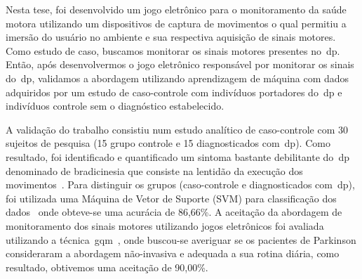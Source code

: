 


Nesta tese, foi desenvolvido um jogo eletrônico para o monitoramento da saúde motora utilizando um dispositivos de captura de movimentos o qual permitiu a imersão do usuário no ambiente e sua respectiva aquisição de sinais motores. Como estudo de caso, buscamos monitorar os sinais motores presentes no~\ac{dp}. Então, após desenvolvermos o jogo eletrônico responsável por monitorar os sinais do~\ac{dp}, validamos a abordagem utilizando aprendizagem de máquina com dados adquiridos por um estudo de caso-controle com indivíduos portadores do~\ac{dp} e indivíduos controle sem o diagnóstico estabelecido. 

A validação do trabalho consistiu num estudo analítico de caso-controle com 30 sujeitos de pesquisa (15 grupo controle e 15 diagnosticados com~\ac{dp}). Como resultado, foi identificado e quantificado um sintoma bastante debilitante do~\ac{dp} denominado de bradicinesia que consiste na lentidão da execução dos movimentos~\cite{protpar010}. Para distinguir os grupos (caso-controle e diagnosticados com~\ac{dp}),
foi utilizada uma Máquina de Vetor de Suporte (SVM) para classificação dos dados~\cite{datamining2005} onde obteve-se uma acurácia de 86,66\%. A aceitação da abordagem de monitoramento dos sinais motores utilizando jogos eletrônicos foi avaliada utilizando a técnica~\ac{gqm}~\cite{van1999goal}, onde buscou-se averiguar se os pacientes de Parkinson consideraram a abordagem não-invasiva e adequada a sua rotina diária, como resultado, obtivemos uma aceitação de 90,00\%.






